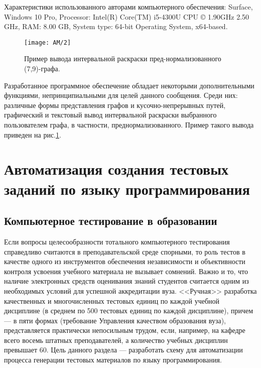 Характеристики использованного авторами компьютерного обеспечения: \foreignlanguage{english}{Surface},
\foreignlanguage{english}{Windows} 10 \foreignlanguage{english}{Pro}, \foreignlanguage{english}{Processor}:
\foreignlanguage{english}{Intel}(\foreignlanguage{english}{R})
\foreignlanguage{english}{Core}(\foreignlanguage{english}{TM})
\foreignlanguage{english}{i}5-4300\foreignlanguage{english}{U} \foreignlanguage{english}{CPU} ©
1.90\foreignlanguage{english}{GHz} 2.50 \foreignlanguage{english}{GHz}, \foreignlanguage{english}{RAM}: 8.00
\foreignlanguage{english}{GB}, \foreignlanguage{english}{System} \foreignlanguage{english}{type}:
64-\foreignlanguage{english}{bit} \foreignlanguage{english}{Operating} \foreignlanguage{english}{System},
\foreignlanguage{english}{x}64-\foreignlanguage{english}{based}.

\begin{figure}[H]\label{AKM_ch1_img2}
	\centering
	\texttt{[image: AM/2]}
	\caption{Пример вывода интервальной раскраски пред-нормализованного (7,9)-графа.}
\end{figure}

Разработанное программное обеспечение обладает некоторыми дополнительными функциями, непринципиальными для целей данного
сообщения. 
Среди них: различные формы представления графов и кусочно-непрерывных путей, графический и текстовый вывод интервальной
раскраски выбранного пользователем графа, в частности, преднормализованного. Пример такого вывода приведен на рис.\ref{AKM_ch1_img2}.











\chapter{Автоматизация создания тестовых заданий по языку программирования}\label{AKM_ch2}


\section{Компьютерное тестирование в образовании}\label{AKM_ch2_1}
Если вопросы целесообразности тотального компьютерного тестирования справедливо считаются в
преподавательской среде спорными, то роль тестов в качестве одного из инструментов обеспечения независимости и
объективности контроля усвоения учебного материала не вызывает сомнений. Важно и то, что наличие электронных средств
оценивания знаний студентов считается одним из необходимых условий для успешной аккредитации вуза. <<Ручная>> разработка
качественных и многочисленных тестовых единиц по каждой учебной дисциплине (в среднем по 500 тестовых единиц по каждой
дисциплине), причем --- в пяти формах (требование Управления качеством образования вуза), представляется практически
непосильным трудом, если, например, на кафедре всего восемь штатных преподавателей, а количество учебных дисциплин
превышает 60.
Цель данного раздела --- разработать схему для автоматизации процесса генерации тестовых материалов по языку
программирования.

